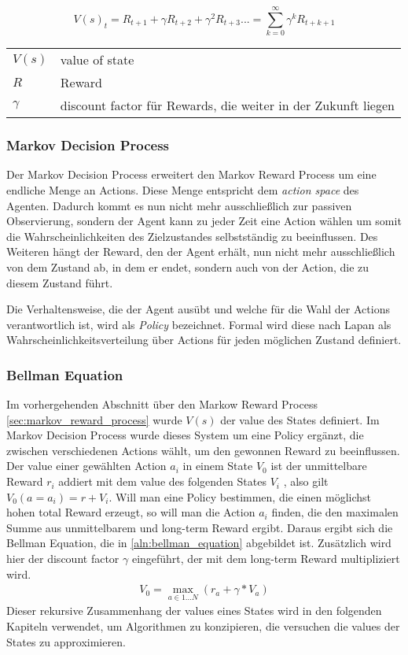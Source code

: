 \documentclass[11pt]{scrartcl}
\makeatletter
\newenvironment{conditions}
  {\par\vspace{\abovedisplayskip}\noindent\begin{tabular}{>{$}l<{$} @{${}:{}$} l}}
  {\end{tabular}\par\vspace{\belowdisplayskip}}
\makeatother
\begin{document}
\begin{equation}
V(s)_t = R_{t+1} + \gamma R_{t+2} + \gamma^2 R_{t+3} ... = \sum_{k=0}^\infty \gamma^{k} R_{t+k+1}
\label{eq:value-of-state}
\end{equation} 

\begin{conditions}
 V(s)     	&  value of state \\
 R	     	&  Reward \\   
 \gamma 	&  discount factor für Rewards, die weiter in der Zukunft liegen
\end{conditions}


\subsubsection{Markov Decision Process}
Der Markov Decision Process erweitert den Markov Reward Process um eine endliche Menge an Actions.
Diese Menge entspricht dem \textit{action space} des Agenten. Dadurch kommt es nun nicht mehr
ausschließlich zur passiven Observierung, sondern der Agent kann zu jeder Zeit eine Action wählen um
somit die Wahrscheinlichkeiten des Zielzustandes selbstständig zu beeinflussen. Des Weiteren hängt 
der Reward, den der Agent erhält, nun nicht mehr ausschließlich von dem Zustand ab, in dem er endet,
sondern auch von der Action, die zu diesem Zustand führt. 

Die Verhaltensweise, die der Agent ausübt und welche für die Wahl der Actions verantwortlich ist,
wird als \textit{Policy} bezeichnet. Formal wird diese nach Lapan\cite[~S.22 f.]{L2018} als
Wahrscheinlichkeitsverteilung über Actions für jeden möglichen Zustand definiert.

\newpage
\subsubsection{Bellman Equation}
Im vorhergehenden Abschnitt über den Markow Reward Process \ref{sec:markov_reward_process}
wurde $V(s)$ der value des States definiert. Im Markov Decision Process wurde dieses
System um eine Policy ergänzt, die zwischen verschiedenen Actions wählt, um den gewonnen
Reward zu beeinflussen. Der value einer gewählten Action $a_i$ in einem State $V_0$ ist
der unmittelbare Reward $r_i$ addiert mit dem value des folgenden States $V_i$
\cite[~S.167]{L2018}, also gilt $V_0(a=a_i) = r + V_i$. Will man eine Policy bestimmen,
die einen möglichst hohen total Reward erzeugt, so will man die Action $a_i$ finden, die
den maximalen Summe aus unmittelbarem und long-term Reward ergibt. Daraus ergibt sich die
Bellman Equation, die in \ref{aln:bellman_equation} abgebildet ist. Zusätzlich wird hier
der discount factor $\gamma$ eingeführt, der mit dem long-term Reward multipliziert wird.
\begin{align}
  V_0 = \max_{a \in 1\dots N} \left(r_a + \gamma * V_a\right)
  \label{aln:bellman_equation}
\end{align}
\noindent
Dieser rekursive Zusammenhang der values eines States wird in den folgenden Kapiteln
verwendet, um Algorithmen zu konzipieren, die versuchen die values der States zu
approximieren.
\end{document}
